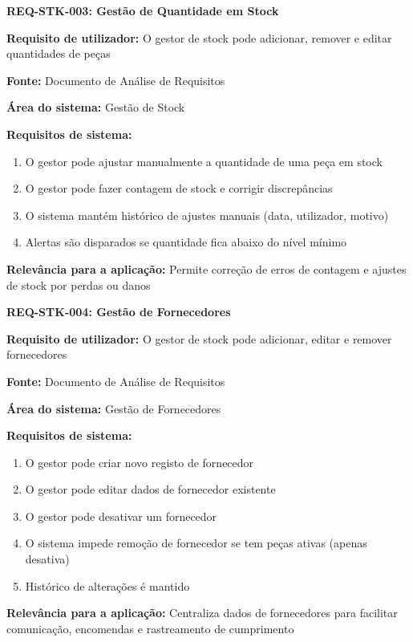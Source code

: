 \documentclass[11pt,a4paper]{article}
\newcommand{\reqheader}[1]{{\noindent\large\bfseries\color{sectionblue}#1}\par\vspace{0.3cm}}
\newcommand{\reqfield}[2]{{\noindent\textbf{#1:} #2}\par\vspace{0.2cm}}
\begin{document}
\vspace{0.8cm}

\reqheader{REQ-STK-003: Gestão de Quantidade em Stock}

\reqfield{Requisito de utilizador}{O gestor de stock pode adicionar, remover e editar quantidades de peças}

\reqfield{Fonte}{Documento de Análise de Requisitos}

\reqfield{Área do sistema}{Gestão de Stock}

\reqfield{Requisitos de sistema}{
	\begin{enumerate}
		\item O gestor pode ajustar manualmente a quantidade de uma peça em stock
		\item O gestor pode fazer contagem de stock e corrigir discrepâncias
		\item O sistema mantém histórico de ajustes manuais (data, utilizador, motivo)
		\item Alertas são disparados se quantidade fica abaixo do nível mínimo
	\end{enumerate}
}

\reqfield{Relevância para a aplicação}{Permite correção de erros de contagem e ajustes de stock por perdas ou danos}

\vspace{0.8cm}

\reqheader{REQ-STK-004: Gestão de Fornecedores}

\reqfield{Requisito de utilizador}{O gestor de stock pode adicionar, editar e remover fornecedores}

\reqfield{Fonte}{Documento de Análise de Requisitos}

\reqfield{Área do sistema}{Gestão de Fornecedores}

\reqfield{Requisitos de sistema}{
	\begin{enumerate}
		\item O gestor pode criar novo registo de fornecedor
		\item O gestor pode editar dados de fornecedor existente
		\item O gestor pode desativar um fornecedor
		\item O sistema impede remoção de fornecedor se tem peças ativas (apenas desativa)
		\item Histórico de alterações é mantido
	\end{enumerate}
}

\reqfield{Relevância para a aplicação}{Centraliza dados de fornecedores para facilitar comunicação, encomendas e rastreamento de cumprimento}
\end{document}

